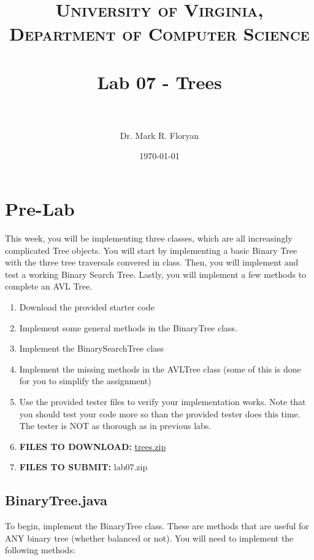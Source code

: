 \documentclass[paper=a4, fontsize=11pt, parskip=full]{scrartcl} %
\title{
\normalfont \normalsize
\textsc{University of Virginia, Department of Computer Science} \\ [25pt] %
\horrule{0.5pt} \\[0.4cm] %
\huge Lab 07 - Trees \\ %
\horrule{2pt} \\[0.5cm] %
}
\author{Dr. Mark R. Floryan} %
\date{\normalsize\today} %
\numberwithin{equation}{section} %
\numberwithin{figure}{section} %
\numberwithin{table}{section} %
\begin{document}
\maketitle %


\section{Pre-Lab}

This week, you will be implementing three classes, which are all increasingly complicated Tree objects. You will start by implementing a basic Binary Tree with the three tree traversals convered in class. Then, you will implement and test a working Binary Search Tree. Lastly, you will implement a few methods to complete an AVL Tree.

\begin{enumerate}
	\item Download the provided starter code
	\item Implement some general methods in the BinaryTree class.
	\item Implement the BinarySearchTree class
	\item Implement the missing methods in the AVLTree class (some of this is done for you to simplify the assignment)
	\item Use the provided tester files to verify your implementation works. Note that you should test your code more so than the provided tester does this time. The tester is NOT as thorough as in previous labs.
	\item \textbf{FILES TO DOWNLOAD:} \href{https://markfloryan.github.io/dsa1/labs/lab07%20-%20Trees/code/trees.zip}{trees.zip}
	\item \textbf{FILES TO SUBMIT:} lab07.zip
\end{enumerate}


\subsection{BinaryTree.java}

To begin, implement the BinaryTree class. These are methods that are useful for ANY binary tree (whether balanced or not). You will need to implement the following methods:
\end{document}
